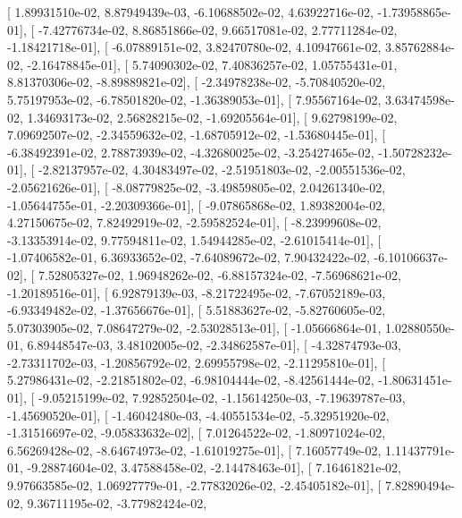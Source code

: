 \documentclass{article}
\begin{document}
       [  1.89931510e-02,   8.87949439e-03,  -6.10688502e-02,
          4.63922716e-02,  -1.73958865e-01],
       [ -7.42776734e-02,   8.86851866e-02,   9.66517081e-02,
          2.77711284e-02,  -1.18421718e-01],
       [ -6.07889151e-02,   3.82470780e-02,   4.10947661e-02,
          3.85762884e-02,  -2.16478845e-01],
       [  5.74090302e-02,   7.40836257e-02,   1.05755431e-01,
          8.81370306e-02,  -8.89889821e-02],
       [ -2.34978238e-02,  -5.70840520e-02,   5.75197953e-02,
         -6.78501820e-02,  -1.36389053e-01],
       [  7.95567164e-02,   3.63474598e-02,   1.34693173e-02,
          2.56828215e-02,  -1.69205564e-01],
       [  9.62798199e-02,   7.09692507e-02,  -2.34559632e-02,
         -1.68705912e-02,  -1.53680445e-01],
       [ -6.38492391e-02,   2.78873939e-02,  -4.32680025e-02,
         -3.25427465e-02,  -1.50728232e-01],
       [ -2.82137957e-02,   4.30483497e-02,  -2.51951803e-02,
         -2.00551536e-02,  -2.05621626e-01],
       [ -8.08779825e-02,  -3.49859805e-02,   2.04261340e-02,
         -1.05644755e-01,  -2.20309366e-01],
       [ -9.07865868e-02,   1.89382004e-02,   4.27150675e-02,
          7.82492919e-02,  -2.59582524e-01],
       [ -8.23999608e-02,  -3.13353914e-02,   9.77594811e-02,
          1.54944285e-02,  -2.61015414e-01],
       [ -1.07406582e-01,   6.36933652e-02,  -7.64089672e-02,
          7.90432422e-02,  -6.10106637e-02],
       [  7.52805327e-02,   1.96948262e-02,  -6.88157324e-02,
         -7.56968621e-02,  -1.20189516e-01],
       [  6.92879139e-03,  -8.21722495e-02,  -7.67052189e-03,
         -6.93349482e-02,  -1.37656676e-01],
       [  5.51883627e-02,  -5.82760605e-02,   5.07303905e-02,
          7.08647279e-02,  -2.53028513e-01],
       [ -1.05666864e-01,   1.02880550e-01,   6.89448547e-03,
          3.48102005e-02,  -2.34862587e-01],
       [ -4.32874793e-03,  -2.73311702e-03,  -1.20856792e-02,
          2.69955798e-02,  -2.11295810e-01],
       [  5.27986431e-02,  -2.21851802e-02,  -6.98104444e-02,
         -8.42561444e-02,  -1.80631451e-01],
       [ -9.05215199e-02,   7.92852504e-02,  -1.15614250e-03,
         -7.19639787e-03,  -1.45690520e-01],
       [ -1.46042480e-03,  -4.40551534e-02,  -5.32951920e-02,
         -1.31516697e-02,  -9.05833632e-02],
       [  7.01264522e-02,  -1.80971024e-02,   6.56269428e-02,
         -8.64674973e-02,  -1.61019275e-01],
       [  7.16057749e-02,   1.11437791e-01,  -9.28874604e-02,
          3.47588458e-02,  -2.14478463e-01],
       [  7.16461821e-02,   9.97663585e-02,   1.06927779e-01,
         -2.77832026e-02,  -2.45405182e-01],
       [  7.82890494e-02,   9.36711195e-02,  -3.77982424e-02,
\end{document}
